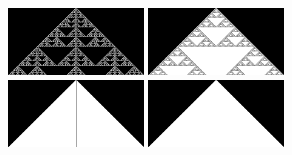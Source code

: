 \documentclass{article}
\begin{document}
\begin{figure}
    \includegraphics[width=0.32\textwidth]{ca-rules/double1-close/rule-150.png}%
    \hspace{0.01\textwidth}%
    \includegraphics[width=0.32\textwidth]{ca-rules/double1-close/rule-182.png}\\%
    \vspace{0.01\textwidth}%
    \includegraphics[width=0.32\textwidth]{ca-rules/double1-close/rule-222.png}%
    \hspace{0.01\textwidth}%
    \includegraphics[width=0.32\textwidth]{ca-rules/double1-close/rule-254.png}%
    \hspace{0.01\textwidth}%
    \caption{}%
    \label{fig:supplement:ca-rules-double-close}
\end{figure}
\end{document}

